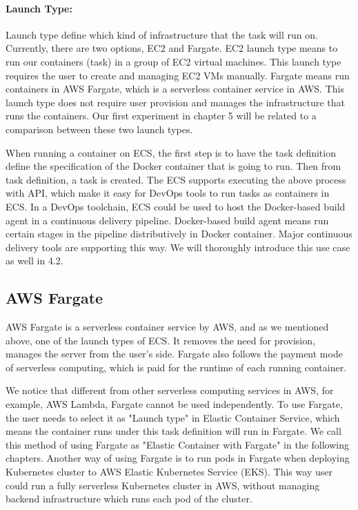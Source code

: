 \paragraph{Launch Type:} Launch type define which kind of infrastructure that the task will run on. Currently, there are two options, EC2 and Fargate. EC2 launch type means to run our containers (task) in a group of EC2 virtual machines. This launch type requires the user to create and managing EC2 VMs manually. Fargate means run containers in AWS Fargate, which is a serverless container service in AWS. This launch type does not require user provision and manages the infrastructure that runs the containers.  Our first experiment in chapter 5 will be related to a comparison between these two launch types.
\par
When running a container on ECS, the first step is to have the task definition define the specification of the Docker container that is going to run. Then from task definition, a task is created. The ECS supports executing the above process with API, which make it easy for DevOps tools to run tasks as containers in ECS.
In a DevOps toolchain, ECS could be used to host the Docker-based build agent in a continuous delivery pipeline. Docker-based build agent means run certain stages in the pipeline distributively in Docker container. Major continuous delivery tools are supporting this way. We will thoroughly introduce this use case as well in 4.2.
\subsection{AWS Fargate}
AWS Fargate is a serverless container service by AWS, and as we mentioned above, one of the launch types of ECS. It removes the need for provision, manages the server from the user's side. Fargate also follows the payment mode of serverless computing, which is paid for the runtime of each running container. 
\par
We notice that different from other serverless computing services in AWS, for example, AWS Lambda, Fargate cannot be used independently. To use Fargate, the user needs to select it as "Launch type" in Elastic Container Service, which means the container runs under this task definition will run in Fargate.  We call this method of using Fargate as "Elastic Container with Fargate" in the following chapters. Another way of using Fargate is to run pods in Fargate when deploying Kubernetes cluster to AWS Elastic Kubernetes Service (EKS). This way user could run a fully serverless Kubernetes cluster in AWS, without managing backend infrastructure which runs each pod of the cluster.
